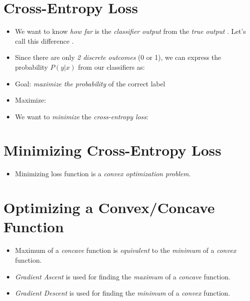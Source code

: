 \documentclass[
	title={Logistic Regression}
]{cs584notes}
\begin{document}
\section{Cross-Entropy Loss}\label{sec:cross-entropy-loss}
\begin{itemize}
	\item We want to know \emph{how far} is the \emph{classifier output}  from the \emph{true output} .
	Let's call this difference .
	\item Since there are only \emph{2 discrete outcomes} (0 or 1), we can express the probability $P(y|x)$ from our classifiers as:
	\data{\[ P(y|x) = \hat{y}^{y}\cdot (1-\hat{y})^{1-y} \]}
	\item Goal: \emph{maximize the probability} of the correct label 
	\item Maximize:
	\item We want to \emph{minimize} the \emph{cross-entropy loss}:
\end{itemize}

\section{Minimizing Cross-Entropy Loss}\label{sec:minimizing-cross-entropy-loss}
\begin{itemize}
	\item Minimizing loss function  is a \emph{convex optimization problem}.
\end{itemize}

\section{Optimizing a Convex/Concave Function}\label{sec:optimizing-a-convex/concave-function}
\begin{itemize}
	\item Maximum of a \emph{concave} function is \emph{equivalent} to the \emph{minimum} of a \emph{convex} function.
	\item \emph{Gradient Ascent} is used for finding the \emph{maximum} of a \emph{concave} function.
	\item \emph{Gradient Descent} is used for finding the \emph{minimum} of a \emph{convex} function.
\end{itemize}
\end{document}
